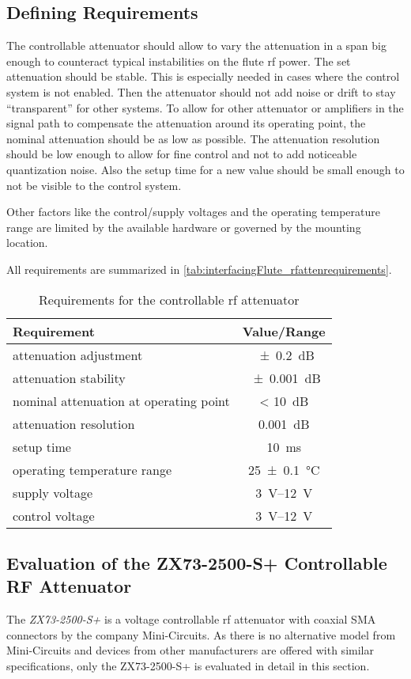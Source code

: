 \subsection{Defining Requirements}
The controllable attenuator should allow to vary the attenuation in a span big enough to counteract typical instabilities on the \gls{flute} \gls{rf} power. The set attenuation should be stable. This is especially needed in cases where the control system is not enabled. Then the attenuator should not add noise or drift to stay ``transparent'' for other systems. To allow for other attenuator or amplifiers in the signal path to compensate the attenuation around its operating point, the nominal attenuation should be as low as possible. The attenuation resolution should be low enough to allow for fine control and not to add noticeable quantization noise. Also the setup time for a new value should be small enough to not be visible to the control system.

Other factors like the control/supply voltages and the operating temperature range are limited by the available hardware or governed by the mounting location.

All requirements are summarized in \autoref{tab:interfacingFlute_rfattenrequirements}.

\begin{table}[tbh]
\caption{Requirements for the controllable \gls{rf} attenuator}
\label{tab:interfacingFlute_rfattenrequirements}
\centering
\begin{tabular}{lc}
\toprule
Requirement & {Value/Range}\\
\midrule
attenuation adjustment & \SI{\pm0.2}{\dB}\\
attenuation stability & \SI{\pm0.001}{\dB}\\
nominal attenuation at operating point & < \SI{10}{\dB}\\
attenuation resolution & \SI{0.001}{\dB}\\
setup time & \SI{10}{\milli\second}\\
operating temperature range & \SI{25\pm0.1}{\celsius}\\
supply voltage & \SIrange{3}{12}{\volt}\\
control voltage & \SIrange{3}{12}{\volt}\\
\bottomrule
\end{tabular}
\end{table}

\subsection{Evaluation of the ZX73-2500-S+ Controllable RF Attenuator}
The \textit{ZX73-2500-S+} is a voltage controllable \gls{rf} attenuator with coaxial SMA connectors by the company Mini-Circuits. As there is no alternative model from Mini-Circuits and devices from other manufacturers are offered with similar specifications, only the ZX73-2500-S+ is evaluated in detail in this section.



